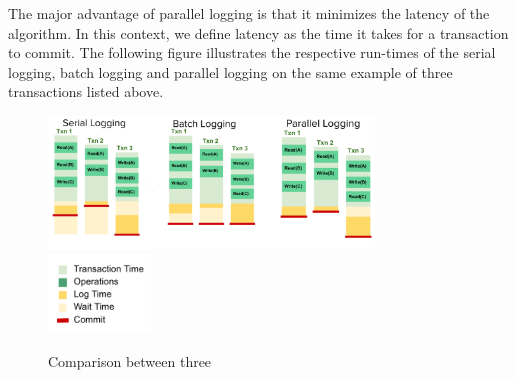 The major advantage of parallel logging is that it minimizes the latency of the algorithm. In this context, we define latency as the time it takes for a transaction to commit. The following figure illustrates the respective run-times of the serial logging, batch logging and parallel logging on the same example of three transactions listed above. 
\begin{figure}[!h]
\caption{Comparison between three }
\centering
\includegraphics[height=100pt]{serial-batch-parallel.png}
\hspace{20pt}
\includegraphics[height=60pt]{leg.png}
\end{figure}